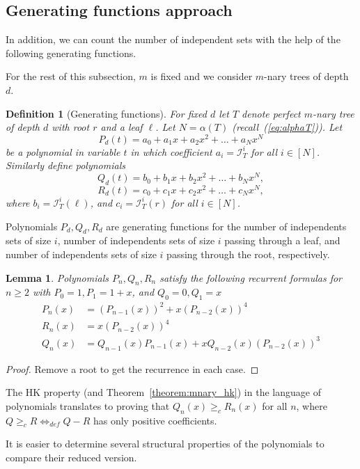 \documentclass{amsart}
\newtheorem{lemma}[theorem]{Lemma}
\newtheorem{definition}[theorem]{Definition}
\theoremstyle{definition}
\newcommand\II{{\mathcal I}}
\begin{document}
\newpage
\subsection{Generating functions approach}

In addition, we can count the number of independent sets with the help of the following generating functions.

For the rest of this subsection, $m$ is fixed and we consider $m$-nary trees of depth $d$.

\begin{definition}[Generating functions]
	For fixed $d$ let $T$ denote perfect $m$-nary tree of depth $d$ with root $r$ and a leaf $\ell$. Let $N=\alpha(T)$ (recall~(\ref{eq:alphaT})). Let $$P_{d}(t)=a_0+a_1x+a_2x^2+\ldots +a_N x^{N}$$ be a polynomial in variable $t$ in which coefficient $a_i=\II^{i}_{T}$ for all $i\in [N]$.
	Similarly define polynomials
	$$Q_d(t)=b_0+b_1x+b_2x^2+\ldots +b_N x^{N},$$
	$$R_d(t)=c_0+c_1x+c_2x^2+\ldots +c_N x^{N},$$
	where $b_i=\II^{i}_{T}(\ell)$, and $c_i=\II^{i}_T(r)$ for all $i\in[N]$.
\end{definition}
Polynomials $P_d, Q_d, R_d$ are generating functions for the number of independents sets of size $i$, number of independents sets of size $i$ passing through a leaf, and number of independents sets of size $i$ passing through the root, respectively.

\begin{lemma}\label{lemma:generating_def}
	Polynomials $P_n, Q_n, R_n$ satisfy the following recurrent formulas for $n\geq 2$ with $P_{0}=1, P_1=1+x$, and $Q_{0}=0, Q_1=x$
	\begin{align*}
		P_n(x) & = (P_{n - 1}(x))^2 + x(P_{n - 2}(x))^4                     \\
		R_n(x) & = x(P_{n - 2}(x))^4                                        \\
		Q_n(x) & = Q_{n - 1}(x)P_{n - 1}(x) + xQ_{n - 2}(x)(P_{n - 2}(x))^3
	\end{align*}
\end{lemma}
\begin{proof}
	Remove a root to get the recurrence in each case.
\end{proof}

The HK property (and Theorem~\ref{theorem:mnary_hk}) in the language of polynomials translates to proving that $Q_{n}(x)\geq_{c} R_{n}(x)$ for all $n$, where $Q\geq _c R \Leftrightarrow_{def} Q-R$ has only positive coefficients.

It is easier to determine several structural properties of the polynomials to compare their reduced version.
\end{document}
